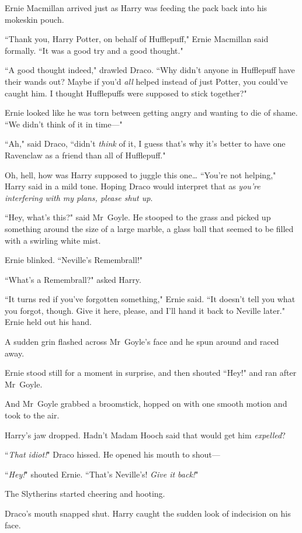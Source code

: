 Ernie Macmillan arrived just as Harry was feeding the pack back into his mokeskin pouch.

``Thank you, Harry Potter, on behalf of Hufflepuff," Ernie Macmillan said formally. ``It was a good try and a good thought."

``A good thought indeed," drawled Draco. ``Why didn't anyone in Hufflepuff have their wands out? Maybe if you'd \emph{all} helped instead of just Potter, you could've caught him. I thought Hufflepuffs were supposed to stick together?"

Ernie looked like he was torn between getting angry and wanting to die of shame. ``We didn't think of it in time—"

``Ah," said Draco, ``didn't \emph{think} of it, I guess that's why it's better to have one Ravenclaw as a friend than all of Hufflepuff."

Oh, hell, how was Harry supposed to juggle this one{\ldots} ``You're not helping," Harry said in a mild tone. Hoping Draco would interpret that as \emph{you're interfering with my plans, please shut up}.

``Hey, what's this?" said Mr~Goyle. He stooped to the grass and picked up something around the size of a large marble, a glass ball that seemed to be filled with a swirling white mist.

Ernie blinked. ``Neville's Remembrall!"

``What's a Remembrall?" asked Harry.

``It turns red if you've forgotten something," Ernie said. ``It doesn't tell you what you forgot, though. Give it here, please, and I'll hand it back to Neville later." Ernie held out his hand.

A sudden grin flashed across Mr~Goyle's face and he spun around and raced away.

Ernie stood still for a moment in surprise, and then shouted ``Hey!" and ran after Mr~Goyle.

And Mr~Goyle grabbed a broomstick, hopped on with one smooth motion and took to the air.

Harry's jaw dropped. Hadn't Madam Hooch said that would get him \emph{expelled}?

``\emph{That idiot!}" Draco hissed. He opened his mouth to shout—

``\emph{Hey!}" shouted Ernie. ``That's Neville's! \emph{Give it back!}"

The Slytherins started cheering and hooting.

Draco's mouth snapped shut. Harry caught the sudden look of indecision on his face.

